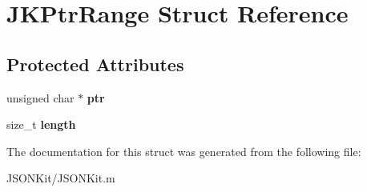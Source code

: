 \hypertarget{struct_j_k_ptr_range}{\section{J\+K\+Ptr\+Range Struct Reference}
\label{struct_j_k_ptr_range}
}
\subsection*{Protected Attributes}
\begin{DoxyCompactItemize}
\item 
\hypertarget{struct_j_k_ptr_range_adb05c5c3ef7a0b101fffce1675070ec3}{unsigned char $\ast$ {\bfseries ptr}}\label{struct_j_k_ptr_range_adb05c5c3ef7a0b101fffce1675070ec3}

\item 
\hypertarget{struct_j_k_ptr_range_a5e17381910c1986b7564ee7fb0201bdb}{size\+\_\+t {\bfseries length}}\label{struct_j_k_ptr_range_a5e17381910c1986b7564ee7fb0201bdb}

\end{DoxyCompactItemize}


The documentation for this struct was generated from the following file\+:\begin{DoxyCompactItemize}
\item 
J\+S\+O\+N\+Kit/J\+S\+O\+N\+Kit.\+m\end{DoxyCompactItemize}
